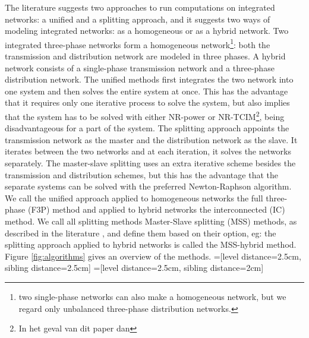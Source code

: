 \documentclass[10pt,journal]{article}
\begin{document}
The literature suggests two approaches to run computations on integrated networks: a unified and a splitting approach, and it suggests two ways of modeling integrated networks: as a homogeneous or as a hybrid network. Two integrated three-phase networks form a homogeneous network\footnote{two single-phase networks can also make a homogeneous network, but we regard only unbalanced three-phase distribution networks.}: both the transmission and distribution network are modeled in three phases. A hybrid network consists of a single-phase transmission network and a three-phase distribution network. The unified methods first integrates the two network into one system and then solves the entire system at once. This has the advantage that it requires only one iterative process to solve the system, but also implies that the system has to be solved with either NR-power or NR-TCIM\footnote{In het geval van dit paper dan}, being disadvantageous for a part of the system. The splitting approach appoints the transmission network as the master and the distribution network as the slave. It iterates between the two networks and at each iteration, it solves the networks separately. The master-slave splitting uses an extra iterative scheme besides the transmission and distribution schemes, but this has the advantage that the separate systems can be solved with the preferred Newton-Raphson algorithm. We call the unified approach applied to homogeneous networks the full three-phase (F3P) method and applied to hybrid networks the interconnected (IC) method. We call all splitting methods Master-Slave splitting (MSS) methods, as described in the literature \cite{Sun2008}, and define them based on their option, eg: the splitting approach applied to hybrid networks is called the MSS-hybrid method. Figure \ref{fig:algorithms} gives an overview of the methods. 
=[level distance=2.5cm, sibling distance=2.5cm]
=[level distance=2.5cm, sibling distance=2cm]
\end{document}
